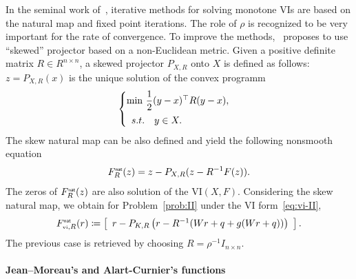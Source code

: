 {In the seminal work of~\cite{Sibony1970}, iterative methods for solving monotone VIs are based on the natural map and fixed point iterations. The role of $\rho$ is recognized to be very important for the rate of convergence. To improve the methods,~\citet{Sibony1970} proposes to use ``skewed'' projector based on a non-Euclidean metric. Given a positive definite matrix $R\in R^{n\times n}$, a skewed projector $P_{X,R}$ onto $X$ is defined as follows: $z  = P_{X,R}(x)$ is the unique solution of the convex programm
\begin{equation}
  \label{eq:opt-proj-skew}
  \begin{cases}
    \min\, \Frac 1 2 (y-x)^\top R (y-x), \\[2mm]
    \begin{array}{ll}
    s.t. & y \in X .
  \end{array}
  \end{cases}
\end{equation} 
The skew natural map can be also defined and yield the following nonsmooth equation
\begin{equation}
  \label{eq:skew-natural-NE}
   F_R^\nat(z) = z - P_{X,R}(z-R^{-1} F(z)).
\end{equation}
The zeros of $F_R^{\hbox{\sf \tiny{nat}}}(z)$ are also solution of the $\mathrm{VI}(X,F)$.
Considering the skew natural map, we obtain for Problem~\ref{prob:II} under the VI form~\eqref{eq:vi-II},
\begin{equation}
  \label{eq:natural-typeII}
  F_{\vitwo,R}^\nat(r) \coloneqq \left[
  \begin{array}{l} 
    r - P_{K,R}\left(r  - R^{-1} ( W r +q   + g(Wr+q))\right)  \end{array}\right].
\end{equation}
The previous case is retrieved by choosing $R = \rho^{-1} I_{n\times n}$.


\paragraph{Jean--Moreau's and Alart-Curnier's functions}

}
